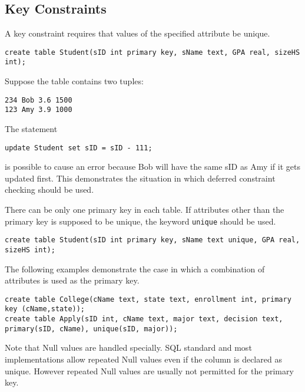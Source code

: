 \subsection{Key Constraints}
A key constraint requires that values of the specified attribute be unique.
\begin{lstlisting}
create table Student(sID int primary key, sName text, GPA real, sizeHS int);
\end{lstlisting}
Suppose the table contains two tuples:
\begin{lstlisting}
234 Bob 3.6 1500
123 Amy 3.9 1000
\end{lstlisting}
The statement
\begin{lstlisting}
update Student set sID = sID - 111;
\end{lstlisting}
is possible to cause an error because Bob will have the same sID as Amy if it gets updated first. This demonstrates the situation in which deferred constraint checking should be used.

There can be only one primary key in each table. If attributes other than the primary key is supposed to be unique, the keyword \texttt{unique} should be used.
\begin{lstlisting}
create table Student(sID int primary key, sName text unique, GPA real, sizeHS int);
\end{lstlisting}
The following examples demonstrate the case in which a combination of attributes is used as the primary key.
\begin{lstlisting}
create table College(cName text, state text, enrollment int, primary key (cName,state));
create table Apply(sID int, cName text, major text, decision text, primary(sID, cName), unique(sID, major));
\end{lstlisting}
Note that Null values are handled specially. SQL standard and most implementations allow repeated Null values even if the column is declared as unique. However repeated Null values are usually not permitted for the primary key.
